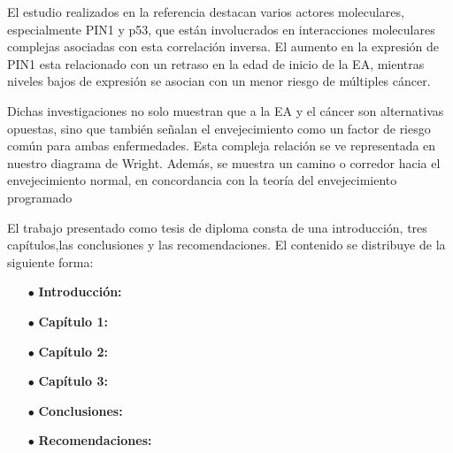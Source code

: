 El estudio realizados en la referencia \cite{Lanni_2020} destacan varios actores moleculares, especialmente PIN1 y p53, que están involucrados en interacciones moleculares complejas asociadas con esta correlación inversa. El aumento en la expresión de PIN1 esta relacionado con un retraso en la edad de inicio de la EA, mientras niveles bajos de expresión se asocian con un menor riesgo de múltiples cáncer.

Dichas investigaciones no solo muestran que a la EA y el cáncer son alternativas opuestas, sino que también señalan el envejecimiento como un factor de riesgo común para ambas enfermedades. Esta compleja relación se ve representada en nuestro diagrama de Wright. Además, se muestra un camino o corredor hacia el envejecimiento normal, en concordancia con la 	teoría del envejecimiento programado \cite{Magalh_es_2012, 	Gems_2022}

\alert{El trabajo presentado como tesis de diploma consta de una introducción, tres capítulos,las conclusiones y las recomendaciones. El contenido se distribuye de la siguiente forma:}

\begin{itemize}
	\item[$\bullet$] \textbf{Introducción:}
	
	\item[$\bullet$] \textbf{Capítulo 1:} 
	
	\item[$\bullet$] \textbf{Capítulo 2:} 
	
	\item[$\bullet$] \textbf{Capítulo 3:} 
	
	\item[$\bullet$] \textbf{Conclusiones:} 
	
	\item[$\bullet$] \textbf{Recomendaciones:} 
	
	
\end{itemize}
